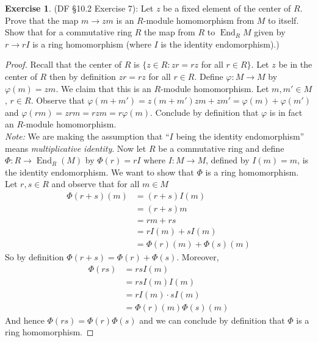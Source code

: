 \documentclass[8pt]{amsart}
\theoremstyle{plain}%
\theoremstyle{definition}
\newtheorem*{exercise}{Exercise}%
\theoremstyle{remark}
\numberwithin{equation}{section}
\begin{document}
\begin{exercise}
(DF \S 10.2 Exercise 7): Let $z$ be a fixed element of the center of $R$. Prove that the map $m \to zm$ is an $R$-module homomorphism from $M$ to itself. Show that for a commutative ring $R$ the map from $R$ to $\operatorname{End}_R{M}$ given by $r \to rI$ is a ring homomorphism (where $I$ is the identity endomorphism).)
	\begin{proof}
		Recall that the center of $R$ is $\{z \in R : zr = rz$ for all $r \in R\}$. Let $z$ be in the center of $R$ then by definition $zr = rz$ for all $r \in R$. Define $\varphi : M \to M$ by $\varphi(m) = zm$. We claim that this is an $R$-module homomorphism. Let $m, m' \in M$, $r \in R$. Observe that $\varphi(m + m') = z(m + m') zm + zm' = \varphi(m) + \varphi(m')$ and $\varphi(rm) = zrm = rzm = r\varphi(m)$. Conclude by definition that $\varphi$ is in fact an $R$-module homomorphism.\\

		\textit{Note:} We are making the assumption that ``$I$ being the identity endomorphism'' means \textit{multiplicative identity}. Now let $R$ be a commutative ring and define $\Phi : R \to \operatorname{End}_R(M)$ by $\Phi(r) = rI$ where $I : M \to M$, defined by $I(m) = m$, is the identity endomorphism. We want to show that $\Phi$ is a ring homomorphism. Let $r, s \in R$ and observe that for all $m \in M$
		\begin{align*}
			\Phi(r + s)(m) &= (r + s)I(m)\\
			&= (r + s)m\\
			&= rm + rs\\
			&= rI(m) + sI(m)\\
			&= \Phi(r)(m) + \Phi(s)(m)
		\end{align*}
		So by definition $\Phi(r + s) = \Phi(r) + \Phi(s)$. Moreover,
		\begin{align*}
			\Phi(rs) &= rsI(m)\\
			&= rsI(m)I(m)\\
			&= rI(m) \cdot sI(m)\\
			&= \Phi(r)(m) \Phi(s)(m)
		\end{align*}
		And hence $\Phi(rs) = \Phi(r)\Phi(s)$ and we can conclude by definition that $\Phi$ is a ring homomorphism.
	\end{proof}
\end{exercise}
\end{document}

